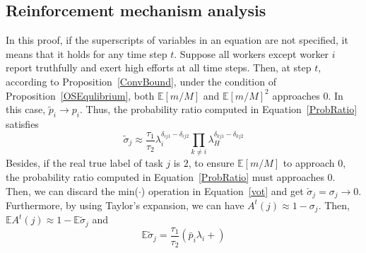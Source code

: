 \documentclass{article}
\begin{document}
\subsection{Reinforcement mechanism analysis}
In this proof, if the superscripts of variables in an equation are not specified, it means that it holds for any time step $t$. Suppose all workers except worker $i$ report truthfully and exert high efforts at all time steps.
Then, at step $t$, according to Proposition~\ref{ConvBound}, under the condition of Proposition~\ref{OSEqulibrium}, 
both $\mathbb{E}[m/M]$ and $\mathbb{E}[m/M]^2$ approaches $0$.
In this case, $\tilde{p}_i\rightarrow p_i$. Thus, the probability ratio computed in Equation~\ref{ProbRatio} satisfies
\begin{equation}
\label{ProbRatioApp}
\tilde{\sigma}_j\approx \frac{\tau_{1}}{\tau_{2}}\lambda_i^{\delta_{ij1}-\delta_{ij2}}{\prod}_{k\neq i}\lambda_H^{\delta_{kj1}-\delta_{kj2}}
\end{equation}
Besides, if the real true label of task $j$ is $2$, to ensure $\mathbb{E}[m/M]$ to approach $0$, the probability ratio computed in Equation~\ref{ProbRatio} must approaches $0$.
Then, we can discard the min($\cdot$) operation in Equation~\ref{vot} and get $\check{\sigma}_j = \sigma_j\rightarrow 0$.
Furthermore, by using Taylor's expansion, we can have $A^{t}(j)\approx 1-\sigma_j$. Then, $\mathbb{E}A^{t}(j)\approx 1-\mathbb{E}\tilde{\sigma}_j$ and
\begin{equation}
\mathbb{E}\tilde{\sigma}_j=\frac{\tau_{1}}{\tau_{2}}(\bar{p}_i\lambda_i+)
\end{equation}
\end{document}
